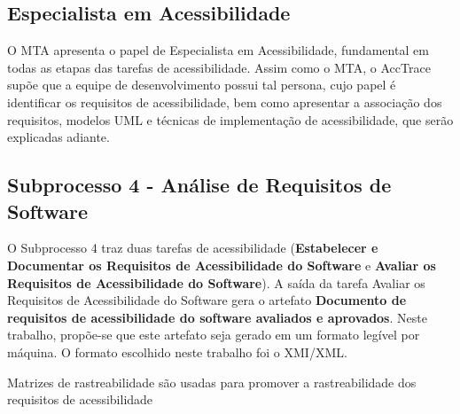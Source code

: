 \documentclass[runningheads,a4paper]{llncs}
\begin{document}
\subsection{Especialista em Acessibilidade}

O MTA apresenta o papel de Especialista em Acessibilidade, fundamental em todas
as etapas das tarefas de acessibilidade. Assim como o MTA, o AccTrace supõe que
a equipe de desenvolvimento possui tal persona, cujo papel é identificar os
requisitos de acessibilidade, bem como apresentar a associação dos requisitos,
modelos UML e técnicas de implementação de acessibilidade, que serão explicadas
adiante.

\subsection{Subprocesso 4 - Análise de Requisitos de Software}

O Subprocesso 4 traz duas tarefas de acessibilidade (\textbf{Estabelecer e
Documentar os Requisitos de Acessibilidade do Software} e \textbf{Avaliar os
Requisitos de Acessibilidade do Software}). A saída da tarefa {Avaliar os
Requisitos de Acessibilidade do Software} gera o artefato \textbf{Documento de
requisitos de acessibilidade do software avaliados e aprovados}. Neste trabalho,
propõe-se que este artefato seja gerado em um formato legível por máquina. O
formato escolhido neste trabalho foi o XMI/XML.

Matrizes de rastreabilidade são usadas para promover a rastreabilidade dos
requisitos de acessibilidade
\end{document}
